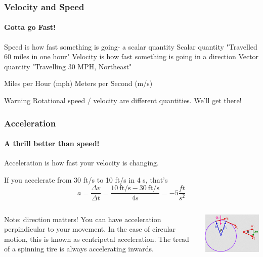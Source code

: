 \documentclass{beamer}%
\begin{document}
\begin{frame}
\frametitle{Velocity and Speed}
\framesubtitle{Gotta go Fast!}

\begin{outline}
	\1 Speed is how fast something is going- a scalar quantity
		\2 Scalar quantity
		\2 "Travelled 60 miles in one hour"
	\1 Velocity is how fast something is going in a direction
		\2 Vector quantity
		\2 "Travelling 30 MPH, Northeast"
\end{outline}

\begin{examples}
\begin{outline}
	\1 Miles per Hour (mph)
	\1 Meters per Second (m/s)
\end{outline}
\end{examples}

\begin{alertblock}{Warning}
	Rotational speed / velocity are different quantities. We'll get there!
\end{alertblock}

\end{frame}


\begin{frame}
\frametitle{Acceleration}
\framesubtitle{A thrill better than speed!}

Acceleration is how fast your velocity is changing.

If you accelerate from 30 ft/s to 10 ft/s in 4 s, that's
\begin{equation}
	a = \frac{\Delta v}{\Delta t} = \frac{10 \ \mbox{ft/s} - 30 \ \mbox{ft/s}}{4 s} = - 5 \frac{ft}{s^2} \nonumber
\end{equation} 
\begin{columns}
Note: direction matters! You can have acceleration perpindicular to your movement. In the case of circular motion, this is known as centripetal acceleration. The tread of a spinning tire is always accelerating inwards.

\includegraphics[width=1.0\textwidth]{img_Mechatronics_Terminology_centrip.png}
\end{columns}

\end{frame}
\end{document}
